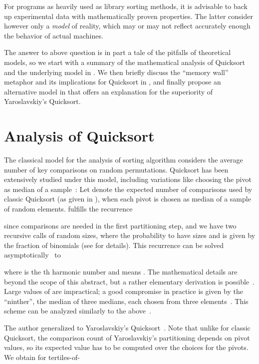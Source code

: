 \documentclass[]{theotage}
\begin{document}
For programs as heavily used as library sorting methods, it is advisable to back up 
experimental data with mathematically proven properties.
The latter consider however only a \emph{model} of reality,
which may or may not reflect accurately enough the behavior of actual machines.

The answer to above question is in part a tale of the pitfalls of theoretical models,
so we start with a summary of the mathematical analysis of Quicksort and
the underlying model in .
We then briefly discuss the ``memory wall'' metaphor and its implications for Quicksort in ,
and finally propose an alternative model in  
that offers an explanation for the superiority of Yaroslavskiy's Quicksort.


\section{Analysis of Quicksort}
\label{sec:classic-analysis}

The classical model for the analysis of sorting algorithm considers the 
average number of key comparisons on random permutations.
Quicksort has been extensively studied under this model,
including variations like choosing the pivot as median of a sample~\cite{Hoare1962,VanEmden1970VanFun,Sedgewick1975,Martinez2001,Durand2003pseudonine}:
Let  denote the expected number of comparisons used by classic Quicksort 
(as given in \cite{Sedgewick1978}), when each
pivot is chosen as median of a sample of  random elements.  fulfills
the recurrence

since  comparisons are needed in the first partitioning step, 
and we have two recursive calls of random sizes, 
where the probability to have sizes  and  is given by the fraction of
binomials (see \cite{MartinezNebelWild2015aofaFullPaper} for details).
This recurrence can be solved asymptotically~\cite{VanEmden1970VanFun,Sedgewick1975} to

where  is the th harmonic number 
and  means .
The mathematical details are beyond the scope of this abstract, 
but a rather elementary derivation is possible~\cite{Martinez2001}.
Large values of  are impractical; a good compromise in practice is given by the ``ninther'', 
the median of three medians, each chosen from three elements~\cite{Bentley1993}.
This scheme can be analyzed similarly to the above~\cite{Durand2003pseudonine}.

The author generalized  to Yaroslavskiy's Quicksort~\cite{Wild2012,Wild2012thesis,MartinezNebelWild2015aofaFullPaper}.
Note that unlike for classic Quicksort, 
the comparison count of Yaroslavskiy's partitioning depends on pivot values,
so its expected value has to be computed over the choices for the pivots.
We obtain for tertiles-of-
\end{document}
